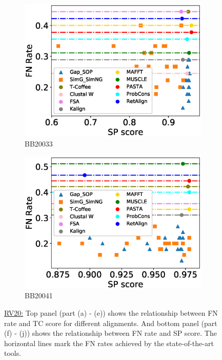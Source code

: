 \begin{figure}[!htbp]
\begin{adjustwidth}{-1.5cm}{-1cm}
\begin{subfigure}{0.22\textwidth}
			\includegraphics[width=\columnwidth]{Figure/summary/precomputedInit/Balibase/BB20033_fnrate_vs_sp_2}
			\caption{BB20033}
		\end{subfigure}	
		\begin{subfigure}{0.22\textwidth}
			\includegraphics[width=\columnwidth]{Figure/summary/precomputedInit/Balibase/BB20041_fnrate_vs_sp_2}
			\caption{BB20041}
		\end{subfigure}
		\end{adjustwidth}
		\caption[FN rate vs TC score on RV20]{\underline{RV20:} Top panel (part (a) - (e)) shows the relationship between FN rate and TC score for different alignments. And bottom panel (part (f) - (j)) shows the relationship between FN rate and SP score. The horizontal lines mark the FN rates achieved by the state-of-the-art tools.}
		\label{fig:rv20_fnrate_vs_tc}

\end{figure}
